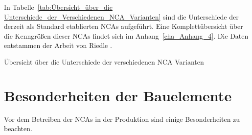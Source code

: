 In Tabelle~\ref{tab:Übersicht_über_die Unterschiede_der_Verschiedenen_NCA_Varianten} sind die Unterschiede der derzeit als Standard etablierten NCAs aufgeführt. Eine Komplettübersicht über die  Kenngrößen dieser NCAs findet sich im Anhang~\ref{cha_Anhang_4}. Die Daten entstammen der Arbeit von Riedle \cite{Riedle2015}. 


\begin{table}[h]
\centering

\caption{Übersicht über die Unterschiede der verschiedenen NCA Varianten}
\label{tab:Übersicht_über_die Unterschiede_der_Verschiedenen_NCA_Varianten}
\end{table}









\section{Besonderheiten der Bauelemente}\label{cha_Besonderheiten_der_Bauelemente}

Vor dem Betreiben der NCAs in der Produktion sind einige Besonderheiten zu beachten.

